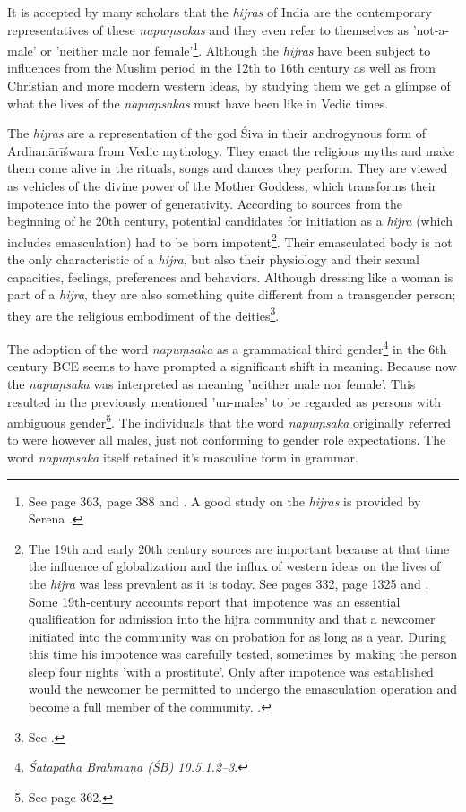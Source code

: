 It is accepted by many scholars that the {\em hijras} of India are the contemporary representatives of these {\em napuṃsakas} and they even refer to themselves as 'not-a-male' or 'neither male nor female'\footnote{See \cite{zwilling} page 363, \cite{goldman} page 388 and \cite{wendy}. A good study on the {\em hijras} is provided by Serena \cite{nanda}.}. Although the {\em hijras} have been subject to influences from the Muslim period in the 12th to 16th century as well as from Christian and more modern western ideas, by studying them we get a glimpse of what the lives of the {\em napuṃsakas} must have been like in Vedic times. 

The {\em hijras} are a representation of the god Śiva in their androgynous form of Ardhanārīśwara from Vedic mythology. They enact the religious myths and make them come alive in the rituals, songs and dances they perform. They are viewed as vehicles of the divine power of the Mother Goddess, which transforms their impotence into the power of generativity. According to sources from the beginning of he 20th century, potential candidates for initiation as a {\em hijra} (which includes emasculation) had to be born impotent\footnote{The 19th and early 20th century sources are important because at that time the influence of globalization and the influx of western ideas on the lives of the {\em hijra} was less prevalent as it is today. See \cite{ibbetson} pages 332, \cite{shah} page 1325 and \cite{bhimbhai}. Some 19th-century accounts report that impotence was an essential qualification for admission into the hijra community and that a newcomer initiated into the community was on probation for as long as a year. During this time his impotence was carefully tested, sometimes by making the person sleep four nights 'with a prostitute'. Only after impotence was established would the newcomer be permitted to undergo the emasculation operation and become a full member of the community. \cite{preston}.}. Their emasculated body is not the only characteristic of a {\em hijra}, but also their physiology and their sexual capacities, feelings, preferences and behaviors. Although dressing like a woman is part of a {\em hijra}, they are also something quite different from a transgender person; they are the religious embodiment of the deities\footnote{See \cite{nanda}.}.

The adoption of the word {\em napuṃsaka} as a grammatical third gender\footnote{{\em Śatapatha Brāhmaṇa (ŚB) 10.5.1.2–3}.} in the 6th century BCE seems to have prompted a significant shift in meaning. Because now the {\em napuṃsaka} was interpreted as meaning 'neither male nor female'. This resulted in the previously mentioned 'un-males' to be regarded as persons with ambiguous gender\footnote{See \cite{zwilling2000} page 362.}. The individuals that the word {\em napuṃsaka} originally referred to were however all males, just not conforming to gender role expectations. The word {\em napuṃsaka} itself retained it's masculine form in grammar.

